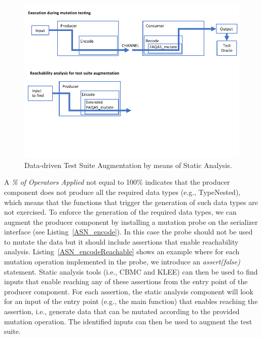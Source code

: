 \begin{figure}[h]
  \centering
    \includegraphics[width=14cm]{images/dataDrivenTestSuiteAugmentation}
      \caption{Data-driven Test Suite Augmentation by means of Static Analysis.}
      \label{fig:dataDrivenTestSuiteAugmentation}
\end{figure}

A \emph{\% of Operators Applied} not equal to 100\% indicates that the producer component does not produce all the required data types (e.g., TypeNested), which means that the functions that trigger the generation of such data types are not exercised. To enforce the generation of the required data types, we can augment the producer component by installing a mutation probe on the serializer interface (see Listing~\ref{ASN_encode}). In this case the probe should not be used to mutate the data but it should include assertions that enable reachability analysis. Listing~\ref{ASN_encodeReachable} shows an example where for each mutation operation implemented in the probe, we introduce an \emph{assert(false)} statement. Static analysis tools (i.e., CBMC and KLEE)  can then be used to find inputs that enable reaching any of these assertions from the entry point of the producer component. For each assertion, the static analysis component will look for an input of the entry point (e.g., the main function) that enables reaching the assertion, i.e., generate data that can be mutated according to the provided mutation operation. The identified inputs can then be used to augment the test suite.



